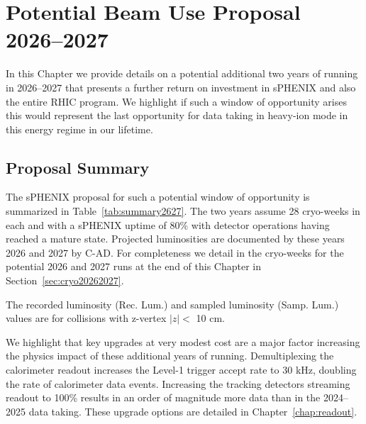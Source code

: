 \chapter{Potential Beam Use Proposal 2026--2027}
\label{chap:beam_use_proposal_extra}

In this Chapter we provide details on a potential additional two years of running in 2026--2027 that presents a further return on investment in sPHENIX and also the entire RHIC program.   We highlight if such a window of opportunity arises this would represent the last opportunity for data taking in heavy-ion mode in this energy regime in our lifetime. 

\section{Proposal Summary}

The sPHENIX proposal for such a potential window of opportunity is summarized in Table~\ref{tab:summary2627}.   The two years assume 28 cryo-weeks in each and with a sPHENIX uptime of 80\% with detector operations having reached a mature state.   Projected luminosities are documented by these years 2026 and 2027 by C-AD.  For completeness we detail in the cryo-weeks for the potential 2026 and 2027 runs at the end of this Chapter in Section~\ref{sec:cryo20262027}.

\begin{table}[h!]
\centering
\caption{The recorded luminosity (Rec. Lum.) and sampled luminosity (Samp. Lum.) values are for collisions with z-vertex $|z|<$ 10 cm.  \label{tab:summary2627}}
\bigskip
\centering

\end{table}

We highlight that key upgrades at very modest cost are a major factor increasing the physics impact of these additional years of running.   Demultiplexing the calorimeter readout increases the Level-1 trigger accept rate to 30 kHz, doubling the rate of calorimeter data events.    Increasing the tracking detectors streaming readout to 100\% results in an order of magnitude more data than in the 2024--2025 data taking.    These upgrade options are detailed in Chapter~\ref{chap:readout}.


